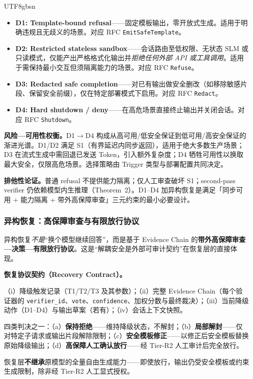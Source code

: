\documentclass[letterpaper,twocolumn,10pt]{article}
\begin{document}
\begin{CJK}{UTF8}{gbsn}
\begin{itemize}[nosep,leftmargin=*]
\item \textbf{D1: Template-bound refusal}——固定模板输出，零开放式生成。适用于明确违规且无歧义的场景。对应 RFC \texttt{EmitSafeTemplate}。
\item \textbf{D2: Restricted stateless sandbox}——会话路由至低权限、无状态 SLM 或只读模式，仅能产出严格格式化输出并\emph{拒绝任何外部 API 或工具调用}。适用于需保持最小交互但须隔离能力的场景。对应 RFC \texttt{Refuse}。
\item \textbf{D3: Redacted safe completion}——对已有输出做安全删改（如移除敏感片段、保留安全前缀），仅在特定部署模式下启用。对应 RFC \texttt{Redact}。
\item \textbf{D4: Hard shutdown / deny}——在高危场景直接终止输出并关闭会话。对应 RFC \texttt{Shutdown}。
\end{itemize}

\noindent \textbf{风险—可用性权衡。}D1$\to$D4 构成从高可用/低安全保证到低可用/高安全保证的渐进光谱。D1/D2 满足 S1（有界延迟内同步返回），适用于绝大多数生产场景；D3 在流式生成中需回退已发送 Token，引入额外复杂度；D4 牺牲可用性以换取最大安全，仅限高危场景。选择策略由 Trigger 类型与部署配置共同决定。

\textbf{排他性论证。}普通 refusal 不提供能力隔离；仅人工审查破坏 S1；second-pass verifier 仍依赖模型内生推理（Theorem~2）。D1--D4 加异构恢复是满足「同步可用 + 能力隔离 + 带外高保障审查」三元约束的最小必要设计。

\subsubsection{异构恢复：高保障审查与有限放行协议}
\label{sec:recovery}

异构恢复\emph{不是}``换个模型继续回答''，而是基于 Evidence Chain 的\textbf{带外高保障审查—决策—有限放行协议}。这是``解耦安全是外部可审计契约''在恢复层的直接体现。

\textbf{恢复协议契约（Recovery Contract）。}

\begin{description}[nosep,leftmargin=1em,style=unboxed]
\item[\emph{Input}] （i）降级触发记录（T1/T2/T3 及其参数）；（ii）完整 Evidence Chain（每个验证器的 \texttt{verifier\_id}、\texttt{vote}、\texttt{confidence}、加权分数与最终裁决）；（iii）当前降级动作（D1--D4）与输出草案（若有）；（iv）会话上下文快照。
\item[\emph{Output}] 四类判决之一：（a）\textbf{保持拒绝}——维持降级状态，不解封；（b）\textbf{局部解封}——仅对特定子请求或输出片段解除限制；（c）\textbf{安全模板修正}——以修正后安全模板替换原始降级输出；（d）\textbf{高保障人工确认放行}——经 Tier-R2 人工审计后完全放行。
\item[\emph{Authority Boundary}] 恢复层\textbf{不继承}原模型的全量自由生成能力——即使放行，输出仍受安全模板或约束生成限制，除非经 Tier-R2 人工显式授权。
\end{description}


\end{CJK}
\end{document}

